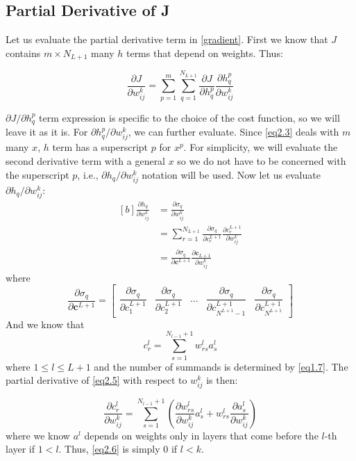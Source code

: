 \documentclass[letterpaper, 11pt]{article}
\newcommand{\pd}[2]{\frac{\partial#1}{\partial#2}}
\newcommand{\w}{w^{k}_{ij}}
\newcommand{\bpd}[2]{\dfrac{\partial#1}{\partial#2}}
\numberwithin{equation}{section}
\numberwithin{figure}{section}
\numberwithin{table}{section}
\begin{document}
\subsection{Partial Derivative of J}
Let us evaluate the partial derivative term in \ref{gradient}. First we know that \(J\) contains \(m \times N_{L+1}\) many \(h\) terms that depend on weights. Thus:

\begin{equation}
	\pd{J}{\w} = \sum_{p=1}^{m}\sum_{q=1}^{N_{L+1}} \pd{J}{h^{p}_{q}}\pd{h^{p}_{q}}{\w}\label{eq2.3}
\end{equation}

\(\partial{J}/\partial{h^{p}_{q}}\) term expression is specific to the choice of the cost function, so we will leave it as it is. For \(\partial{h^{p}_{q}}/\partial{\w}\), we can further evaluate. Since \ref{eq2.3} deals with \(m\) many \(x\), \(h\) term has a superscript \(p\) for \(x^{p}\).  For simplicity, we will evaluate the second derivative term with a general \(x\) so we do not have to be concerned with the superscript \(p\), i.e., \(\partial{h_{q}}/\partial{\w}\) notation will be used. Now let us evaluate \(\partial{h_{q}}/\partial{\w}\):
\begin{equation}
	\begin{aligned}[b]
		\pd{h_{q}}{\w} 
		&= \pd{\sigma_{q}}{\w} \\ 
		&= \sum_{r=1}^{N_{L+1}}\pd{\sigma_{q}}{c^{L+1}_{r}}\pd{c^{L+1}_{r}}{\w}\\
		&= \pd{\sigma_{q}}{\textbf{c}^{L+1}}\pd{\textbf{c}_{L+1}}{\w}\label{eq2.4}
	\end{aligned}
\end{equation}
where 
\begin{equation}
	\pd{\sigma_{q}}{\textbf{c}^{L+1}} = 
		\begin{bmatrix}
			\bpd{\sigma_{q}}{c^{L+1}_{1}}&
			\bpd{\sigma_{q}}{c^{L+1}_{2}}&
			\hdots&
			\bpd{\sigma_{q}}{c^{L+1}_{N^{L+1}-1}}&
			\bpd{\sigma_{q}}{c^{L+1}_{N^{L+1}}}
		\end{bmatrix}
\end{equation}
And we know that 
\begin{equation}
		c^{l}_{r}
		= \sum_{s=1}^{N_{l-1}+1}w^{l}_{rs}a^{l}_{s}\label{eq2.5}
\end{equation}
where \(1 \le l \le L+1\) and the number of summands is determined by \ref{eq1.7}. The partial derivative of \ref{eq2.5} with respect to \(\w\) is then:

\begin{equation}
	\pd{c^{l}_{r}}{\w}
	= \sum_{s=1}^{N_{l-1}+1}(\pd{w^{l}_{rs}}{\w}a^{l}_{s}+w^{l}_{rs}\pd{a^{l}_{s}}{\w})\label{eq2.6}
\end{equation}
where we know \(a^{l}\) depends on weights only in layers that come before the \(l\)-th layer if \(1 < l\). Thus, \ref{eq2.6} is simply 0 if \(l < k\). 
\end{document}
